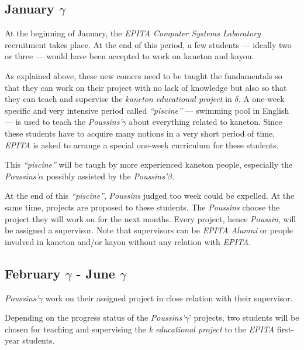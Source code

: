\begin{multicols}{2}
%
%

\subsection{January $\gamma$}

At the beginning of January, the \textit{EPITA Computer Systems Laboratory}
recruitment takes place. At the end of this period, a few students ---
ideally two or three --- would have been accepted to work on kaneton and
kayou.

As explained above, these new comers need to be taught the fundamentals so
that they can work on their project with no lack of knowledge but also so
that they can teach and supervise the \textit{kaneton educational project}
in $\delta$. A one-week specific and very intensive period called
\textit{``piscine''} --- swimming pool in English --- is used to teach
the \textit{Poussins'$\gamma$} about everything related to kaneton.
Since these students have to acquire many notions in a very short period of
time, \textit{EPITA} is asked to arrange a special one-week curriculum for
these students.

This \textit{``piscine''} will be taugh by more experienced kaneton people,
especially the \textit{Poussins'$\alpha$} possibly assisted by the
\textit{Poussins'$\beta$}.

At the end of this \textit{``piscine''}, \textit{Poussins} judged too week
could be expelled. At the same time, projects are proposed to these students.
The \textit{Poussins} choose the project they will work on for the next
months. Every project, hence \textit{Poussin}, will be assigned a supervisor.
Note that supervisors can be \textit{EPITA Alumni} or people involved in
kaneton and/or kayou without any relation with \textit{EPITA}.

%
%

\subsection{February $\gamma$ - June $\gamma$}

\textit{Poussins'$\gamma$} work on their assigned project in close relation
with their supervisor.

Depending on the progress status of the \textit{Poussins'$\gamma$}' projects,
two students will be chosen for teaching and supervising the
\textit{k educational project} to the \textit{EPITA} first-year students.


\end{multicols}
